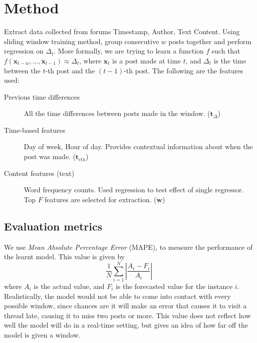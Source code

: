 \documentclass[12 pt]{article}
\begin{document}
\newcommand{\vocab}{\mathbf{v}}
\newcommand{\dtvec}{\mathbf{t}_\Delta}
\newcommand{\ctxvec}{\mathbf{t}_\text{ctx}}
\newcommand{\dt}{\Delta_t}


\section{Method}

Extract data collected from forums Timestamp, Author, Text Content. Using sliding window training method, group consecutive $w$ posts together and perform regression on $\Delta_t$. More formally, we are trying to learn a function $f$ such that $f(\mathbf{x}_{t-w},\hdots, \mathbf{x}_{t-1}) \approx \Delta_{t}$, where $\mathbf{x}_t$ is a post made at time $t$, and $\Delta_t$ is the time between the $t$-th post and the $(t-1)$-th post. The following are the features used:
\begin{description}
	\item[Previous time differences] All the time differences between posts made in the window. ($\mathbf{t}_\Delta$)
	\item[Time-based features] Day of week, Hour of day. Provides contextual information about when the post was made. ($\mathbf{t}_{\text{ctx}}$)
	
	\item[Content features (text)] Word frequency counts. Used regression to test effect of single regressor. Top $F$ features are selected for extraction. ($\mathbf{w}$)

\end{description}


\subsection{Evaluation metrics}
We use \emph{Mean Absolute Percentage Error} (MAPE), to measure the performance of the learnt model. This value is given by
\[
	\frac{1}{N}\sum^N_{i=1}\left|\frac{A_i-F_i}{A_i}\right|
\]
where $A_i$ is the actual value, and $F_i$ is the forecasted value for the instance $i$. Realistically, the model would not be able to come into contact with every possible window, since chances are it will make an error that causes %
it to visit a thread late, causing it to miss two posts or more. This value does not reflect how well the model will do in a real-time setting, but gives an idea of how far off the model is given a window. 
\end{document}
